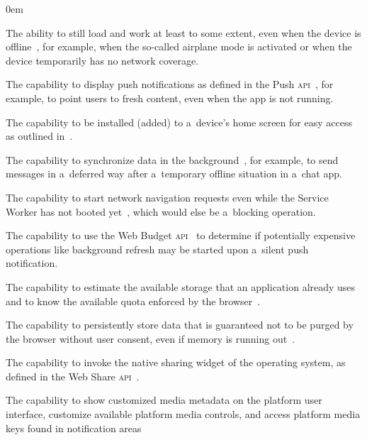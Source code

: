 \documentclass[sigconf,hyphens]{acmart}
\begin{document}
\begin{description}
  \itemsep0em 
  \item[Offline Capabilities] The ability to still load and work
    at least to some extent, even when the device is offline~\cite{russell2017serviceworkers},
    for example, when the so-called airplane mode is activated
    or when the device temporarily has no network coverage.
  \item[Push Notifications] The capability to display push notifications as defined in
    the Push \textsc{api}~\cite{beverloo2017pushapi}, for example,
    to point users to fresh content, even when the app is not running.
  \item[Add to Home Screen] The capability to be installed (added) to a~device's home screen
    for easy access as outlined in~\cite{kinlan2017a2hs}.
  \item[Background Sync] The capability to synchronize data
    in the background~\cite{russell2017serviceworkers},
    for example, to send messages in a~deferred way
    after a~temporary offline situation in a~chat app.
  \item[Navigation Preload] The capability to start network navigation requests
    even while the Service Worker has not booted yet~\cite{archibald2017navigationpreload},
    which would else be a~blocking operation.
  \item[Silent Push] The capability to use the Web Budget
    \textsc{api}~\cite{beverloo2017budgetapi}
    to determine if potentially expensive operations
    like background refresh may be started
    upon a~silent push notification.
  \item[Storage Estimation] The capability to estimate the available storage
    that an application already uses and to know the available quota enforced by the
    browser~\cite{vankesteren2018storage}.
  \item[Persistent Storage] The capability to persistently store data
    that is guaranteed not to be purged by the browser without user consent,
    even if memory is running out~\cite{vankesteren2018storage}.
  \item[Web Share] The capability to invoke the native sharing widget
    of the operating system, as defined in the Web Share \textsc{api}~\cite{giuca2017webshare}.
  \item[Media Session] The capability to show customized media metadata
    on the platform user interface, customize available platform media controls,
    and access platform media keys found in notification areas

\end{description}
\end{document}
